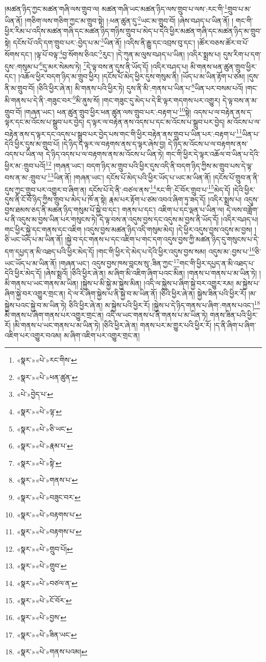 །མཚན་ཉིད་ཀྱང་མཚན་གཞི་ལས་གྲུབ་ལ། མཚན་གཞི་ཡང་མཚན་ཉིད་ལས་གྲུབ་པ་ལས་:རང་གི་\footnote{«སྣར་»«པེ་»རང་གིས་}གྲུབ་པ་མ་ཡིན་ནོ། །གཅིག་ལས་གཅིག་ཀྱང་མ་གྲུབ་སྟེ། །:ཕན་ཚུན་དུ་\footnote{«སྣར་»«པེ་»ཕན་ཚུན་}ཡང་མ་གྲུབ་བོ། །ཞེས་བཤད་པ་ཡིན་ནོ། །
གང་གི་ཕྱིར་རིམ་པ་འདིས་མཚན་གཞི་དང་མཚན་ཉིད་གཉིས་གྲུབ་པ་མེད་པ་དེའི་ཕྱིར་མཚན་གཞི་དང་མཚན་ཉིད་མ་གྲུབ་སྟེ། དངོས་པོ་འདི་དག་གྲུབ་པར་:བྱེད་པ་མ་\footnote{«པེ་»བྱེད་པ་}ཡིན་ནོ། །འདིས་ནི་རྒྱུ་དང་འབྲས་བུ་དང་། །ཚོར་བཅས་ཚོར་བ་པོ་སོགས་དང་། །ལྟ་པོ་བལྟ་\footnote{«སྣར་»«པེ་»ལྟ་}བྱ་སོགས་ཅིའང་\footnote{«སྣར་»«པེ་»ཅི་ཡང་}རུང་། །དེ་ཀུན་མ་ལུས་བཤད་པ་ཡིན། །འདིར་སྨྲས་པ། དུས་རིག་པ་དག་དུས་:གསུམ་པ་\footnote{«སྣར་»«པེ་»རྣམ་པ་}དུ་མར་སེམས་ཏེ། \footnote{«སྣར་»«པེ་»སྟེ་}དེ་ལྟ་བས་ན་དུས་ནི་ཡོད་དོ། །འདིར་བཤད་པ། མི་གནས་ཕན་ཚུན་གྲུབ་ཕྱིར་དང་། །འཆོལ་ཕྱིར་བདག་ཉིད་མ་གྲུབ་ཕྱིར། །དངོས་པོ་མེད་ཕྱིར་དུས་གསུམ་ནི། །ཡོད་པ་མ་ཡིན་རྟོག་པ་ཙམ། །དུས་ནི་མ་གྲུབ་བོ། །ཅིའི་ཕྱིར་ཞེ་ན། མི་གནས་པའི་ཕྱིར་ཏེ། དུས་ནི་མི་:གནས་པ་ཡིན་པ་\footnote{«སྣར་»«པེ་»གནས་པ་}ཡིན་པར་བསམ་པའོ། །གང་མི་གནས་པ་དེ་ནི་:གཟུང་བར་\footnote{«སྣར་»«པེ་»བཟུང་བར་}མི་ནུས་སོ། །གང་གཟུང་དུ་མེད་པ་དེ་ཇི་ལྟར་གདགས་པར་འགྱུར། དེ་ལྟ་བས་ན་མ་གྲུབ་བོ། །གཞན་ཡང་། ཕན་ཚུན་གྲུབ་ཕྱིར་ཕན་ཚུན་ལས་གྲུབ་པར་:བརྟག་པ་\footnote{«སྣར་»«པེ་»བརྟགས་པ་}སྟེ། འདས་པ་ལ་བརྟེན་ནས་ད་ལྟར་དང་མ་འོངས་པ་སྒྲུབ་པར་བྱེད། ད་ལྟར་ལ་བརྟེན་ནས་འདས་པ་དང་མ་འོངས་པ་སྒྲུབ་པར་བྱེད། མ་འོངས་པ་ལ་བརྟེན་ནས་ད་ལྟར་དང་འདས་པ་སྒྲུབ་པར་བྱེད་པས་གང་གི་ཕྱིར་བརྟེན་ནས་གྲུབ་པ་ཡིན་པར་:བརྟག་པ་\footnote{«སྣར་»«པེ་»བརྟགས་པ་}ཡིན་པ་དེའི་ཕྱིར་དུས་མ་གྲུབ་པོ། །དེ་ཉིད་ད་ལྟར་ལ་བརྟགས་ནས་ད་ལྟར་ཞེས་བྱ། དེ་ཉིད་མ་འོངས་པ་ལ་བརྟགས་ནས་འདས་པ་ཡིན་ལ། དེ་ཉིད་འདས་པ་ལ་བརྟགས་ནས་མ་འོངས་པ་ཡིན་ཏེ། གང་གི་ཕྱིར་དེ་ལྟར་འཆོལ་བ་ཡིན་པ་དེའི་ཕྱིར་མ་:གྲུབ་པའོ།\footnote{«སྣར་»«པེ་»གྲུབ་པོ།} །གཞན་ཡང་། བདག་ཉིད་མ་གྲུབ་པའི་ཕྱིར་དུས་འདི་ནི་བདག་ཉིད་ཀྱིས་མ་གྲུབ་པས་དེ་ལྟ་བས་ན་མ་:གྲུབ་པ་\footnote{«སྣར་»«པེ་»གྲུབ་}ཡིན་ནོ། །གཞན་ཡང་། དངོས་པོ་མེད་པའི་ཕྱིར་ཡོད་པ་ཡང་མ་ཡིན་ནོ། །དངོས་པོ་གྲུབ་ན་ནི་དུས་ཀྱང་གྲུབ་པར་འགྱུར་བ་ཞིག་ན། དངོས་པོ་དེ་ནི་:བཙལ་ནས་\footnote{«སྣར་»«པེ་»བཙལ་ན་}རང་གི་:ངོ་བོར་གྲུབ་པ་\footnote{«སྣར་»«པེ་»ངོ་བོར་}མེད་དོ། །དེའི་ཕྱིར་དུས་ནི་ངོ་བོ་ཉིད་ཀྱིས་གྲུབ་པ་མེད་པ་ཁོ་ན་སྟེ། རྣམ་པར་རྟོག་པ་ཙམ་འབའ་ཞིག་ཏུ་ཟད་དོ། །འདིར་སྨྲས་པ། འདུས་བྱས་ཐམས་ཅད་ནི་མཚན་ཉིད་གསུམ་པོ་སྐྱེ་བ་དང་། གནས་པ་དང་། འཇིག་པ་དང་ལྡན་པ་ཡིན་ལ། དེ་ལས་བཟློག་པ་ནི་འདུས་མ་བྱས་ཡིན་པར་གསུངས་ཏེ། དེ་ལྟ་བས་ན་འདུས་བྱས་དང་འདུས་མ་བྱས་ནི་ཡོད་དོ། །འདིར་བཤད་པ། གང་ཕྱིར་སྐྱེ་དང་གནས་དང་འཇིག །འདུས་བྱས་མཚན་ཉིད་འདི་གསུམ་མེད། །དེ་ཕྱིར་འདུས་བྱས་འདུས་མ་བྱས། །ཅི་ཡང་ཡོད་པ་མ་ཡིན་ནོ། །སྐྱེ་བ་དང་གནས་པ་དང་འཇིག་པ་གང་དག་འདུས་བྱས་ཀྱི་མཚན་ཉིད་དུ་གསུངས་པ་དེ་དག་དཔྱད་ན་མི་འཐད་པའི་ཕྱིར་མེད་དོ། །གང་གི་ཕྱིར་དེ་མེད་པ་དེའི་ཕྱིར་འདུས་བྱས་སམ། འདུས་མ་:བྱས་པ་\footnote{«སྣར་»«པེ་»བྱས་}ཅི་ཡང་ཡོད་པ་མ་ཡིན་ནོ། །གཞན་ཡང་། འདུས་བྱས་ཁས་བླངས་སུ་:ཟིན་ཀྱང་\footnote{«སྣར་»«པེ་»ཟིན་ཡང་}གང་གི་ཕྱིར་དཔྱད་ན་མི་འཐད་པ་དེའི་ཕྱིར་མེད་དོ། །ཞེས་སྨྲའོ། །ཅིའི་ཕྱིར་ཞེ་ན། མ་ཞིག་མི་འཇིག་ཞིག་པའང་མིན། །གནས་པ་གནས་པ་མ་ཡིན་ཏེ། །མི་གནས་པ་ཡང་གནས་མ་ཡིན། །སྐྱེས་པ་མི་སྐྱེ་མ་སྐྱེས་མིན། །འདི་ལ་སྐྱེས་པ་ཞིག་སྐྱེ་བར་འགྱུར་རམ། མ་སྐྱེས་པ་ཞིག་སྐྱེ་བར་འགྱུར་གྲང་ན། དེ་ལ་རེ་ཞིག་སྐྱེས་པ་ནི་སྐྱེ་བ་མ་ཡིན་ནོ། །ཅིའི་ཕྱིར་ཞེ་ན། སྐྱེས་ཟིན་པའི་ཕྱིར་རོ། །མ་སྐྱེས་པའང་སྐྱེ་བ་མ་ཡིན་ཏེ། ཅིའི་ཕྱིར་ཞེ་ན། མ་སྐྱེས་པའི་ཕྱིར་རོ། །སྐྱེས་པ་དེ་ཉིད་གནས་པ་ཞིག་:གནས་པའང་།\footnote{«སྣར་»«པེ་»གནས་པའམ།} མི་གནས་པ་ཞིག་གནས་པར་འགྱུར་གྲང་ན། འདི་ལ་ཡང་གནས་པ་ནི་གནས་པ་མ་ཡིན་ཏེ། གནས་ཟིན་པའི་ཕྱིར་རོ། །མི་གནས་པ་ཡང་གནས་པ་མ་ཡིན་ཏེ། །ཅིའི་ཕྱིར་ཞེ་ན། གནས་པར་མ་གྱུར་པའི་ཕྱིར་རོ། །ད་ནི་ཞིག་པ་ཞིག་འཇིག་པར་འགྱུར་བའམ། མ་ཞིག་འཇིག་པར་འགྱུར་གྲང་ན། 